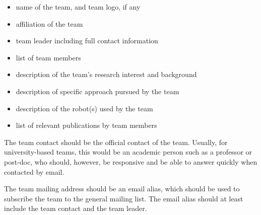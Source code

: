 \begin{itemize}
	\item name of the team, and team logo, if any
	\item affiliation of the team
	\item team leader including full contact information
	\item list of team members
	\item description of the team's research interest and background
	\item description of specific approach pursued by the team
	\item description of the robot(s) used by the team
	\item list of relevant publications by team members

\end{itemize}

The team contact should be the official contact of the team. Usually, for university-based teams, this would be an academic person such as a professor or post-doc, who should, however, be responsive and be able to answer quickly when contacted by email.
\par
The team mailing address should be an email alias, which should be used to subscribe the team to the general \RCAW mailing list. The email alias should at least include the team contact and the team leader.
